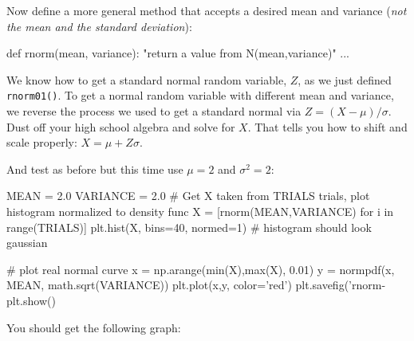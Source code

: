 \begin{fullwidth}
\step Now define a more general method that accepts a desired mean and variance ({\em not the mean and the standard deviation}):

\begin{pyverbatim}
def rnorm(mean, variance):
    "return a value from N(mean,variance)"
    ...
\end{pyverbatim}

\noindent We know how to get a standard normal random variable, $Z$, as we just defined {\tt rnorm01()}. To get a normal random variable with different mean and variance, we reverse the process we used to get a standard normal via $Z = (X-\mu)/\sigma$. Dust off your high school algebra and solve for $X$. That tells you how to shift and scale properly: $X = \mu+ Z\sigma$.

\step And test as before but this time use $\mu=2$ and $\sigma^2 = 2$:

\begin{pyverbatim}
MEAN = 2.0
VARIANCE = 2.0
# Get X taken from TRIALS trials, plot histogram normalized to density func
X = [rnorm(MEAN,VARIANCE) for i in range(TRIALS)]
plt.hist(X, bins=40, normed=1) # histogram should look gaussian

# plot real normal curve
x = np.arange(min(X),max(X), 0.01)
y = normpdf(x, MEAN, math.sqrt(VARIANCE))
plt.plot(x,y, color='red') 
plt.savefig('rnorm-%
plt.show()
\end{pyverbatim}

\noindent You should get the following graph:



\end{fullwidth}
